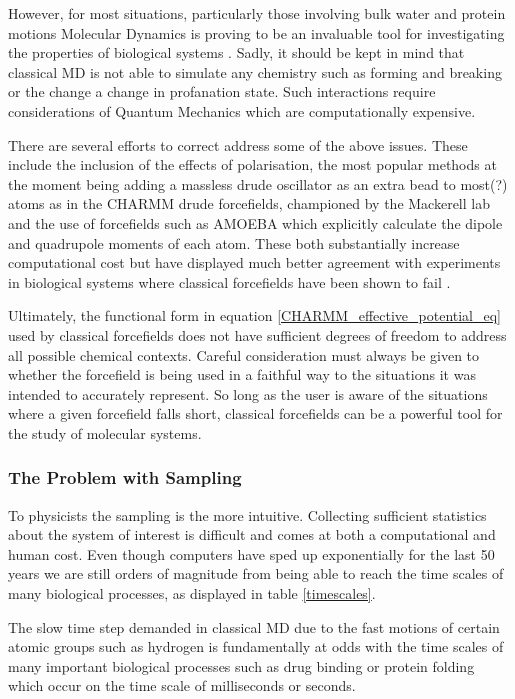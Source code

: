 However, for most situations, particularly those involving bulk water and protein motions Molecular Dynamics is proving to be an invaluable tool for investigating the properties of biological systems \cite{hollingsworth2018}. Sadly, it should be kept in mind that classical MD is not able to simulate any chemistry such as forming and breaking or the change a change in profanation state. Such interactions require considerations of Quantum Mechanics which are computationally expensive.

There are several efforts to correct address some of the above issues. These include the inclusion of the effects of polarisation, the most popular methods at the moment being adding a massless drude oscillator as an extra bead to most(?) atoms as in the CHARMM drude forcefields, championed by the Mackerell lab and the use of forcefields such as AMOEBA which explicitly calculate the dipole and quadrupole moments of each atom. These both substantially increase computational cost but have displayed much better agreement with experiments in biological systems where classical forcefields have been shown to fail \cite{ngo2021}. 

Ultimately, the functional form in equation \ref{CHARMM_effective_potential_eq} used by classical forcefields does not have sufficient degrees of freedom to address all possible chemical contexts. Careful consideration must always be given to whether the forcefield is being used in a faithful way to the situations it was intended to accurately represent. So long as the user is aware of the situations where a given forcefield falls short, classical forcefields can be a powerful tool for the study of molecular systems.

\subsubsection{The Problem with Sampling}

To physicists the sampling is the more intuitive. Collecting sufficient statistics about the system of interest is difficult and comes at both a computational and human cost. Even though computers have sped up exponentially for the last 50 years we are still orders of magnitude from being able to reach the time scales of many biological processes, as displayed in table \ref{timescales}.

The slow time step demanded in classical MD due to the fast motions of certain atomic groups such as hydrogen is fundamentally at odds with the time scales of many important biological processes such as drug binding or protein folding which occur on the time scale of  milliseconds or seconds.  

